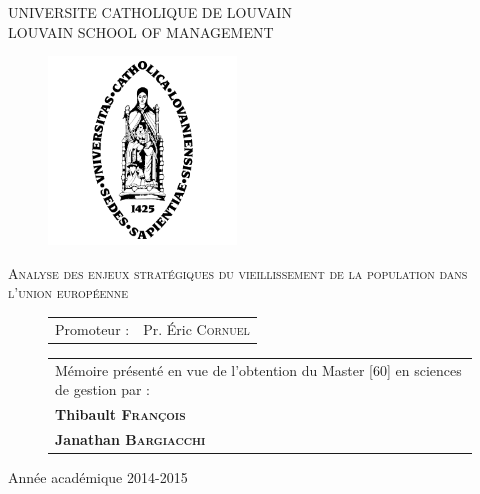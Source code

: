
\parindent=0cm



\begin{center}
{\large    UNIVERSITE CATHOLIQUE DE LOUVAIN \\
LOUVAIN SCHOOL OF MANAGEMENT \\
}
   \end{center}
\vfill

 \begin{figure}[H]
\begin{center}  \hspace*{-10mm} 
	\includegraphics[height = 5cm]{alma.png}
   \end{center}
\end{figure}


\vfill


\begin{center}
{\Large \textsc{Analyse des enjeux stratégiques du vieillissement de la population dans l'union européenne}}
\end{center}



\vfill

 \begin{figure}[H]
 \begin{minipage}[c]{.45\linewidth}
		\begin{tabular}{ll}
		Promoteur : & Pr. Éric \textsc{Cornuel} \\

		\end{tabular}
\end{minipage} \hfill
 \begin{minipage}[c]{.45\linewidth}
 \begin{tabularx}{\linewidth}{p{\textwidth}}
Mémoire présenté en vue de \hbox{l'obtention} du Master [60] en sciences de gestion par :\\
\textbf{Thibault \textsc{François}} \\
\textbf{Janathan \textsc{Bargiacchi}}
\end{tabularx}
\end{minipage}
\end{figure}

\vspace{1,5cm}



\begin{center}
{\large Année académique 2014-2015}
\end{center}
